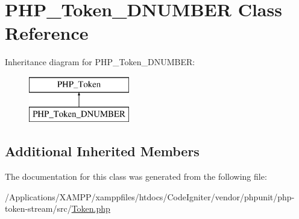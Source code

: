 \hypertarget{class_p_h_p___token___d_n_u_m_b_e_r}{}\section{P\+H\+P\+\_\+\+Token\+\_\+\+D\+N\+U\+M\+B\+ER Class Reference}
\label{class_p_h_p___token___d_n_u_m_b_e_r}
Inheritance diagram for P\+H\+P\+\_\+\+Token\+\_\+\+D\+N\+U\+M\+B\+ER\+:\begin{figure}[H]
\begin{center}
\leavevmode
\includegraphics[height=2.000000cm]{class_p_h_p___token___d_n_u_m_b_e_r}
\end{center}
\end{figure}
\subsection*{Additional Inherited Members}


The documentation for this class was generated from the following file\+:\begin{DoxyCompactItemize}
\item 
/\+Applications/\+X\+A\+M\+P\+P/xamppfiles/htdocs/\+Code\+Igniter/vendor/phpunit/php-\/token-\/stream/src/\mbox{\hyperlink{_token_8php}{Token.\+php}}\end{DoxyCompactItemize}
